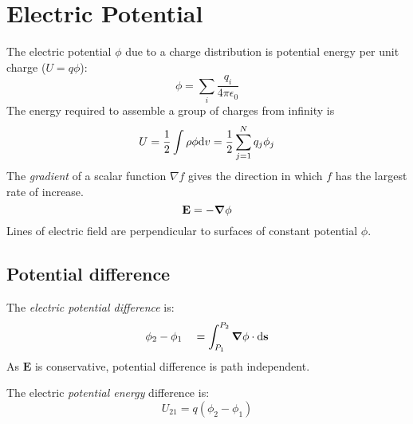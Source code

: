 \section{Electric Potential}
The electric potential $\phi$ due to a charge distribution is potential energy per unit charge ($U = q\phi$):
\begin{equation*}
    \phi = \sum_{i} \frac{q_i}{4 \pi \epsilon_0}
\end{equation*}
The energy required to assemble a group of charges from infinity is 
\begin{equation*}
    U = \frac{1}{2} \int \rho \phi \differential v = \frac{1}{2}\sum_{j=1}^{N}q_j \phi_j
\end{equation*}
The \textit{gradient} of a scalar function $\nabla f$ gives the direction in which $f$ has the largest
rate of increase.
\begin{equation*}
    \mathbf{E} = - \grad \phi
\end{equation*}
Lines of electric field are perpendicular to surfaces of constant potential $\phi$.

\subsection*{Potential difference}
The \textit{electric potential difference} is:
\begin{equation*}
    \phi_2 - \phi_1 \quad = \int_{P_1}^{P_2} \grad \phi \cdot \differential \mathbf{s}
\end{equation*}
As $\mathbf{E}$ is conservative, potential difference is path independent.

The electric \textit{potential energy} difference is:
\begin{equation*}
    U_{21} = q(\phi_2 - \phi_1)
\end{equation*}